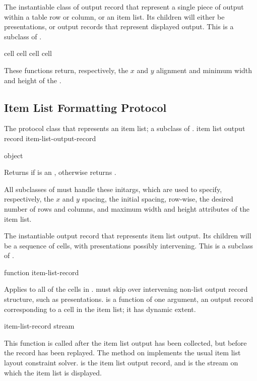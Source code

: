
The instantiable class of output record that represent a single piece of output
within a table row or column, or an item list.  Its children will either be
presentations, or output records that represent displayed output.  This is a
subclass of .

 {cell}
 {cell}
  {cell}
 {cell}

These functions return, respectively, the $x$ and $y$ alignment and minimum
width and height of the  .


\subsection {Item List Formatting Protocol}


The protocol class that represents an item list; a subclass of
.
 {item list output record} {item-list-output-record}

 {object}

Returns  if  is an ,
otherwise returns .


All subclasses of  must handle these initargs, which
are used to specify, respectively, the $x$ and $y$ spacing, the initial spacing,
row-wise, the desired number of rows and columns, and maximum width and height
attributes of the item list.


The instantiable output record that represents item list output.  Its children
will be a sequence of cells, with presentations possibly intervening.  This is a
subclass of .

 {function item-list-record}

Applies  to all of the cells in .
 must skip over intervening non-list output record
structure, such as presentations.   is a function of one argument,
an output record corresponding to a cell in the item list; it has dynamic
extent.

 {item-list-record stream}

This function is called after the item list output has been collected, but
before the record has been replayed.  The method on
 implements the usual item list layout
constraint solver.   is the item list output record, and
 is the stream on which the item list is displayed.
